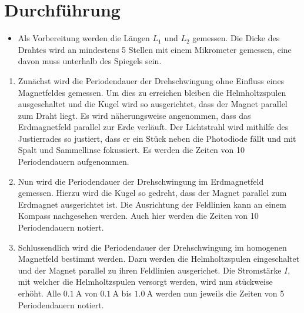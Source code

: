 
\section{Durchführung}
\label{sec:Durchführung}

\begin{itemize}
   \item Als Vorbereitung werden die Längen $L_1$ und $L_2$ gemessen. Die Dicke des
   Drahtes wird an mindestens 5 Stellen mit einem Mikrometer gemessen,
   eine davon muss unterhalb des Spiegels sein.
\end{itemize}
\renewcommand{\labelenumi}{\alph{enumi})}

\begin{enumerate}
  \item Zunächst wird die Periodendauer der Drehschwingung ohne Einfluss
   eines Magnetfeldes gemessen. Um dies zu erreichen bleiben die Helmholtzspulen
    ausgeschaltet und die Kugel wird so ausgerichtet, dass der Magnet parallel zum Draht
    liegt. Es wird näherungsweise angenommen, dass das Erdmagnetfeld parallel zur Erde
    verläuft. Der Lichtstrahl wird mithilfe des Justierrades so justiert,
     dass er ein Stück neben die Photodiode fällt und mit Spalt und Sammellinse
      fokussiert. Es werden die Zeiten von 10 Periodendauern aufgenommen.

      \item Nun wird die Periodendauer der Drehschwingung im Erdmagnetfeld gemessen.
       Hierzu wird die Kugel so gedreht, dass der Magnet parallel zum Erdmagnet
        ausgerichtet ist. Die Ausrichtung der Feldlinien kann an einem Kompass
         nachgesehen werden. Auch hier werden die Zeiten von 10 Periodendauern notiert.

         \item Schlussendlich wird die Periodendauer der Drehschwingung im
          homogenen Magnetfeld bestimmt werden. Dazu werden die Helmholtzspulen
           eingeschaltet und der Magnet parallel zu ihren Feldlinien ausgerichet.
           Die Stromstärke $I$, mit welcher die Helmholtzspulen versorgt werden,
            wird nun stückweise erhöht. Alle $\SI{0.1}{\ampere}$ von
            $\SI{0.1}{\ampere}$ bis $\SI{1.0}{\ampere}$ werden nun jeweils die
             Zeiten von 5 Periodendauern notiert.

\end{enumerate}
